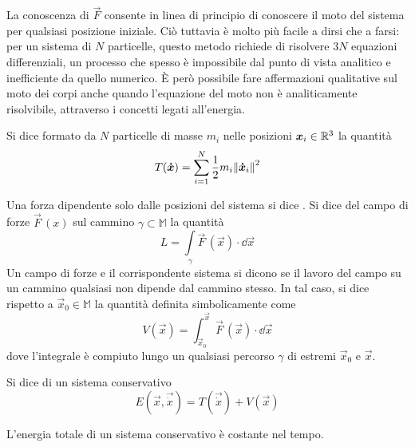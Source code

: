 La conoscenza di $\vec{F}$ consente in linea di principio di conoscere il moto del sistema per qualsiasi posizione iniziale. Ciò tuttavia è molto più facile a dirsi che a farsi: per un sistema di $N$ particelle, questo metodo richiede di risolvere $3N$ equazioni differenziali, un processo che spesso è impossibile dal punto di vista analitico e inefficiente da quello numerico. È però possibile fare affermazioni qualitative sul moto dei corpi anche quando l'equazione del moto non è analiticamente risolvibile, attraverso i concetti legati all'energia.
\begin{definition}
  Si dice  formato da $N$ particelle di masse $m_i$ nelle posizioni $\boldsymbol{x}_i \in \mathbb{R}^3$ la quantità \begin{equation}
    T(\boldsymbol{\dot{x}}) = \sum_{i=1}^{N} \frac{1}{2}m_i\norm{\boldsymbol{\dot{x}}_i}^2
  \end{equation} 
\end{definition}
\begin{definition}
  Una forza dipendente solo dalle posizioni del sistema si dice . Si dice  del campo di forze $\vec{F}\, (x)$ sul cammino $\gamma \subset \mathbb{M}$ la quantità \begin{equation*}
  L = \int\limits_{\gamma} \vec{F}\,(\vec{x})\cdot \dd \vec{x}
  \end{equation*} 
  Un campo di forze e il corrispondente sistema si dicono  se il lavoro del campo su un cammino qualsiasi non dipende dal cammino stesso. In tal caso, si dice  rispetto a $\vec{x}_0 \in \mathbb{M}$ la quantità definita simbolicamente come \begin{equation}
  V(\vec{x}) = \int_{\vec{x}_0}^{\vec{x}} \vec{F}\,(\vec{x})\cdot \dd \vec{x}
  \end{equation} 
  dove l'integrale è compiuto lungo un qualsiasi percorso $\gamma$ di estremi $\vec{x}_0$ e $\vec{x}$.
\end{definition}
\begin{definition}
  Si dice  di un sistema conservativo\begin{equation}
  E(\vec{x},\vec{\dot{x}}) = T(\vec{\dot{x}}) + V(\vec{x})
  \end{equation} 
\end{definition}
\begin{theorem} \label{thm:energyCons}
L'energia totale di un sistema conservativo è costante nel tempo.
\end{theorem}

